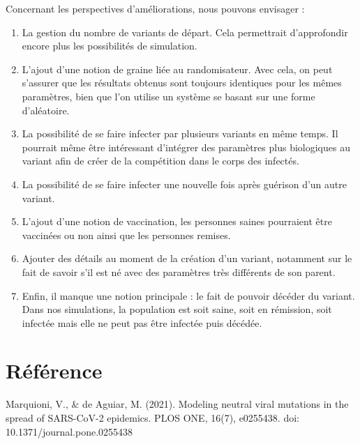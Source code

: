 \documentclass{article}
\begin{document}
\noindent
Concernant les perspectives d'améliorations, nous pouvons envisager :
\begin{enumerate}
    \item La gestion du nombre de variants de départ. Cela permettrait d'approfondir encore plus les possibilités de simulation.
    \item L'ajout d'une notion de graine liée au randomisateur. Avec cela, on peut s'assurer que les résultats obtenus sont toujours identiques pour les mêmes paramètres, bien que l'on utilise un système se basant sur une forme d'aléatoire.
    \item La possibilité de se faire infecter par plusieurs variants en même temps. Il pourrait même être intéressant d'intégrer des paramètres plus biologiques au variant afin de créer de la compétition dans le corps des infectés.
    \item La possibilité de se faire infecter une nouvelle fois après guérison d'un autre variant.
    \item L'ajout d'une notion de vaccination, les personnes saines pourraient être vaccinées ou non ainsi que les personnes remises.
    \item Ajouter des détails au moment de la création d'un variant, notamment sur le fait de savoir s'il est né avec des paramètres très différents de son parent.
    \item Enfin, il manque une notion principale : le fait de pouvoir décéder du variant. Dans nos simulations, la population est soit saine, soit en rémission, soit infectée mais elle ne peut pas être infectée puis décédée.
\end{enumerate}

\section{Référence}

Marquioni, V., & de Aguiar, M. (2021). Modeling neutral viral mutations in the spread of SARS-CoV-2 epidemics. PLOS ONE, 16(7), e0255438. doi: 10.1371/journal.pone.0255438
\end{document}
